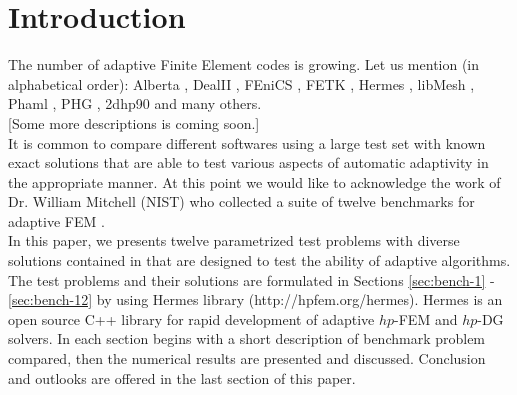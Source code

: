 \section{Introduction}
\label{sec:intro}

The number of adaptive Finite Element codes is growing.
Let us mention (in alphabetical order): Alberta
\cite{alberta}, DealII \cite{dealii}, FEniCS
\cite{fenics}, FETK \cite{fetk}, Hermes \cite{hermes}, libMesh \cite{libmesh},
Phaml \cite{phaml}, PHG \cite{phg}, 2dhp90 \cite{2dhp90} and many others.\\

[Some more descriptions is coming soon.]\\

It is common to compare different softwares using a large test set 
with known exact solutions that are able to test various aspects of 
automatic adaptivity in the appropriate manner. 
At this point we would like to acknowledge the work of 
Dr. William Mitchell (NIST) who collected a suite of 
twelve benchmarks for adaptive FEM \cite{mitchell-1}. \\

In this paper, we presents twelve parametrized test problems 
with diverse solutions contained in \cite{mitchell-1} 
that are designed to test the ability of adaptive algorithms. 
The test problems and their solutions are formulated in Sections 
\ref{sec:bench-1} - \ref{sec:bench-12} by using {\sc Hermes} 
library (http://hpfem.org/hermes). {\sc Hermes} is an open source 
C++ library for rapid development of adaptive $hp$-FEM and 
$hp$-DG solvers. In each section begins with a short description 
of benchmark problem compared, then the numerical results are 
presented and discussed. Conclusion and outlooks are offered 
in the last section of this paper. 
